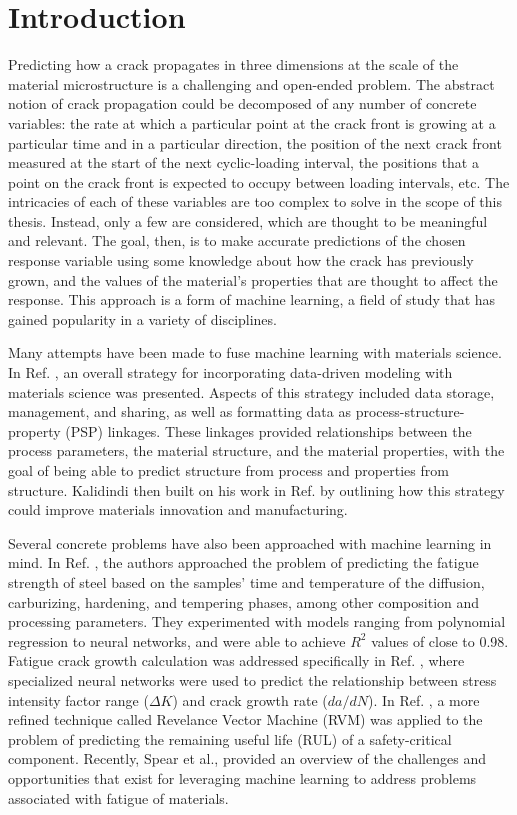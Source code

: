 
\chapter{Introduction}

Predicting how a crack propagates in three dimensions at the scale of the material microstructure is a challenging and open-ended problem.  The abstract notion of crack propagation could be decomposed of any number of concrete variables: the rate at which a particular point at the crack front is growing at a particular time and in a particular direction, the position of the next crack front measured at the start of the next cyclic-loading interval, the positions that a point on the crack front is expected to occupy between loading intervals, etc.  The intricacies of each of these variables are too complex to solve in the scope of this thesis.  Instead, only a few are considered, which are thought to be meaningful and relevant.  The goal, then, is to make accurate predictions of the chosen response variable using some knowledge about how the crack has previously grown, and the values of the material's properties that are thought to affect the response.  This approach is a form of machine learning, a field of study that has gained popularity in a variety of disciplines.

Many attempts have been made to fuse machine learning with materials science.  In Ref. \cite{kalidindi2015}, an overall strategy for incorporating data-driven modeling with materials science was presented.  Aspects of this strategy included data storage, management, and sharing, as well as formatting data as process-structure-property (PSP) linkages.  These linkages provided relationships between the process parameters, the material structure, and the material properties, with the goal of being able to predict structure from process and properties from structure.  Kalidindi then built on his work in Ref. \cite{kalidindi2016} by outlining how this strategy could improve materials innovation and manufacturing.

Several concrete problems have also been approached with machine learning in mind.  In Ref. \cite{agrawal2014}, the authors approached the problem of predicting the fatigue strength of steel based on the samples' time and temperature of the diffusion, carburizing, hardening, and tempering phases, among other composition and processing parameters.  They experimented with models ranging from polynomial regression to neural networks, and were able to achieve $R^2$ values of close to 0.98.  Fatigue crack growth calculation was addressed specifically in Ref. \cite{wang2017}, where specialized neural networks were used to predict the relationship between stress intensity factor range ($\Delta K$) and crack growth rate ($da/dN$).  In Ref. \cite{zio2012}, a more refined technique called Revelance Vector Machine (RVM) was applied to the problem of predicting the remaining useful life (RUL) of a safety-critical component.   Recently, Spear et al., \cite{spear2018} provided an overview of the challenges and opportunities that exist for leveraging machine learning to address problems associated with fatigue of materials.

